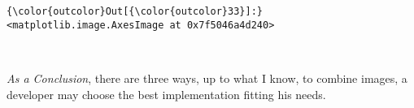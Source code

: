 \documentclass[11pt]{article}
\begin{document}
\begin{Verbatim}[commandchars=\\\{\}]
{\color{outcolor}Out[{\color{outcolor}33}]:} <matplotlib.image.AxesImage at 0x7f5046a4d240>
\end{Verbatim}
            
    \begin{center}
    \end{center}
    { \hspace*{\fill} \\}
    
    \emph{As a Conclusion}, there are three ways, up to what I know, to
combine images, a developer may choose the best implementation fitting
his needs.


    
    
    
    
\end{document}
